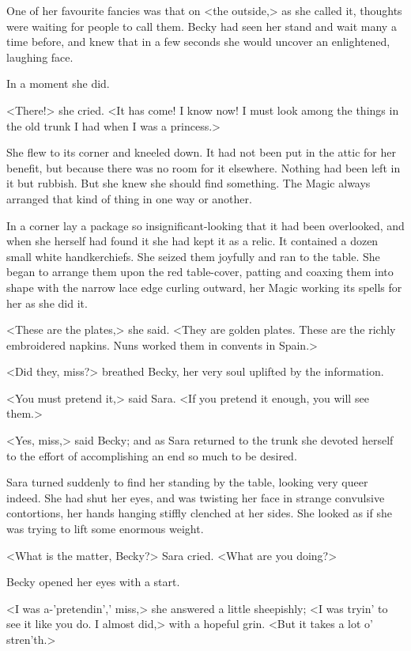 One of her favourite fancies was that on <the outside,> as she called it, thoughts were waiting for people to call them. Becky had seen her stand and wait many a time before, and knew that in a few seconds she would uncover an enlightened, laughing face.

In a moment she did.

<There!> she cried. <It has come! I know now! I must look among the things in the old trunk I had when I was a princess.>

She flew to its corner and kneeled down. It had not been put in the attic for her benefit, but because there was no room for it elsewhere. Nothing had been left in it but rubbish. But she knew she should find something. The Magic always arranged that kind of thing in one way or another.

In a corner lay a package so insignificant-looking that it had been overlooked, and when she herself had found it she had kept it as a relic. It contained a dozen small white handkerchiefs. She seized them joyfully and ran to the table. She began to arrange them upon the red table-cover, patting and coaxing them into shape with the narrow lace edge curling outward, her Magic working its spells for her as she did it.

<These are the plates,> she said. <They are golden plates. These are the richly embroidered napkins. Nuns worked them in convents in Spain.>

<Did they, miss?> breathed Becky, her very soul uplifted by the information.

<You must pretend it,> said Sara. <If you pretend it enough, you will see them.>

<Yes, miss,> said Becky; and as Sara returned to the trunk she devoted herself to the effort of accomplishing an end so much to be desired.

Sara turned suddenly to find her standing by the table, looking very queer indeed. She had shut her eyes, and was twisting her face in strange convulsive contortions, her hands hanging stiffly clenched at her sides. She looked as if she was trying to lift some enormous weight.

<What is the matter, Becky?> Sara cried. <What are you doing?>

Becky opened her eyes with a start.

<I was a-'pretendin',' miss,> she answered a little sheepishly; <I was tryin' to see it like you do. I almost did,> with a hopeful grin. <But it takes a lot o' stren'th.>

